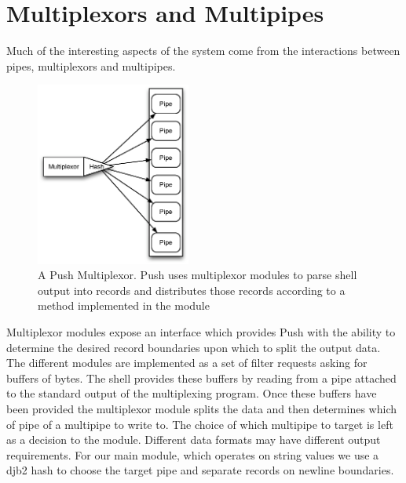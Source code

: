 \documentclass[11pt, letterpaper]{article}
\begin{document}
\section{Multiplexors and Multipipes}
Much of the interesting aspects of the system come from the interactions between pipes, multiplexors and multipipes.


\begin{figure}[htp]
\centering
\includegraphics[width=2.0in]{mux.eps}
\caption{A Push Multiplexor. Push uses multiplexor modules to parse shell output into records and distributes those records according to a method implemented in the module}\label{fig:mux}
\end{figure}
Multiplexor modules expose an interface which provides Push with the ability to determine the desired record boundaries upon which to split the output data. The different modules are implemented as a set of filter requests asking for buffers of bytes. The shell provides these buffers by reading from a pipe attached to the standard output of the multiplexing program. Once these buffers have been provided the multiplexor module splits the data and then determines which of pipe of a multipipe to write to. The choice of which multipipe to target is left as a decision to the module. Different data formats may have different output requirements. For our main module, which operates on string values we use a djb2 hash to choose the target pipe and separate records on newline boundaries.
\end{document}

